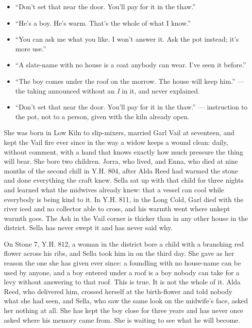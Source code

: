 \documentclass{design/chronicle}
\begin{document}
{\begin{itemize}[leftmargin=1.4em,itemsep=1pt,topsep=3pt,parsep=0pt]
\item “Don’t set that near the door. You’ll pay for it in the thaw.”

\item “He’s a boy. He’s warm. That’s the whole of what I know.”

\item “You can ask me what you like. I won’t answer it. Ask the pot instead; it’s more use.”

\item “A slate-name with no house is a coat anybody can wear. I’ve seen it before.”

\item “The boy comes under the roof on the morrow. The house will keep him.” --- the taking announced without an \emph{I} in it, and never explained.

\item “Don’t set that near the door. You’ll pay for it in the thaw.” --- instruction to the pot, not to a person, given with the kiln already open.

\end{itemize}

She was born in Low Kiln to slip-mixers, married Garl Vail at seventeen, and kept the Vail fire ever since in the way a widow keeps a wound clean: daily, without comment, with a hand that knows exactly how much pressure the thing will bear. She bore two children. Jorra, who lived, and Enna, who died at nine months of the second chill in Y.H. 804, after Alda Reed had warmed the stone and done everything the craft knew. Sella sat up with that child for three nights and learned what the midwives already knew: that a vessel can cool while everybody is being kind to it. In Y.H. 811, in the Long Cold, Garl died with the river iced and no collector able to cross, and his warmth went where unkept warmth goes. The Ash in the Vail corner is thicker than in any other house in the district. Sella has never swept it and has never said why.

On Stone 7, Y.H. 812, a woman in the district bore a child with a branching red flower across his ribs, and Sella took him in on the third day. She gave as her reason the one she has given ever since: a foundling with no house-name can be used by anyone, and a boy entered under a roof is a boy nobody can take for a levy without answering to that roof. This is true. It is not the whole of it. Alda Reed, who delivered him, crossed herself at the birth-flower and told nobody what she had seen, and Sella, who saw the same look on the midwife’s face, asked her nothing at all. She has kept the boy close for three years and has never once asked where his memory came from. She is waiting to see what he will become.

}
\end{document}
